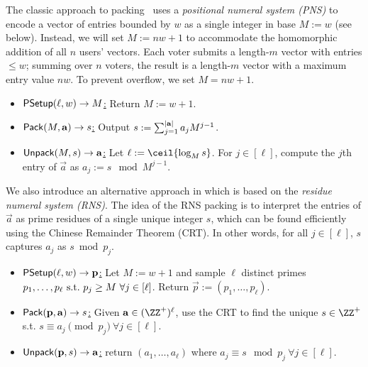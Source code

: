 The classic approach to packing~\cite{ACNS:Groth05,EC:HirSak00} uses a \emph{positional numeral system (PNS)} to encode a vector of entries bounded by $w$ as a single integer in base $M := w$ (see  below).
Instead, we will set $M:= nw+1$ to accommodate the homomorphic addition of all $n$ users' vectors. Each voter submits a length-$m$ vector with entries $\leq w$; summing over $n$ voters, the result is a length-$m$ vector with a maximum entry value $nw$. To prevent overflow, we set $M = nw+1$.

\begin{construction}\label{con:packingPNS}
\hfill
\begin{itemize}%
    \item \underline{$\mathsf{PSetup}(\ell, w) \to M$:} Return $M := w + 1$.
    \item \underline{$\pack(M, \Vec{a}) \to s$:} Output $s := \sum_{j=1}^{\lvert \mathbf{a} \rvert} a_j M^{j-1}$.
    \item \underline{$\unpack(M, s) \to \Vec{a}$:} Let $\ell := \ceil{\log_M{s}}$. For $j \in [\ell]$, compute the $j$th entry of $\Vec{a}$ as $a_j := s \mod{M^{j-1}}$.
\end{itemize}
\end{construction}

We also introduce an alternative approach in  which is based on the \emph{residue numeral system (RNS)}. The idea of the RNS packing is to interpret the entries of $\vec{a}$ as prime residues of a single unique integer $s$, which can be found efficiently using the Chinese Remainder Theorem (CRT). In other words, for all $j \in [\ell]$, $s$ captures $a_j$ as $s \bmod p_j$.

\begin{construction}\label{con:packingRNS}
\hfill
\begin{itemize}%
    \item \underline{$\mathsf{PSetup}(\ell, w) \to \mathbf{p}$:} Let $M := w + 1$ and sample $\ell$ distinct primes $p_1, \dots, p_\ell\allowbreak \mathrm{~s.t.~} p_j \geq M\ \forall j \in [\ell]$. Return $\vec{p} := (p_1, \dots, p_\ell)$.
    \item \underline{$\pack(\vec{p}, \Vec{a}) \to s$:} Given $\Vec{a} \in (\ZZ^+)^\ell$, use the CRT to find the unique $s \in \ZZ^+$ s.t. $s\equiv a_j \pmod{p_j}~\forall j\in[\ell]$.
    \item \underline{$\unpack(\vec{p}, s) \to \Vec{a}$:} return $(a_1, \dots, a_\ell)$ where $a_j \equiv s \mod{p_j}\ \forall j \in [\ell]$.
\end{itemize}
\end{construction}

